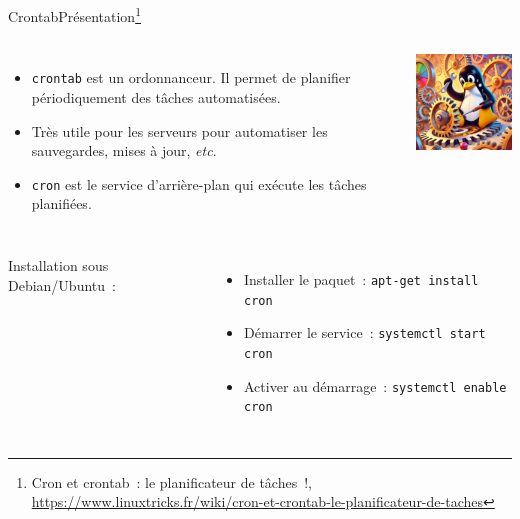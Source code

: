 \documentclass{beamer}
\begin{document}
    \begin{frame}{Crontab}{Présentation\footnote{\label{linuxtricks-cron}Cron et crontab~: le planificateur de tâches~!, \url{https://www.linuxtricks.fr/wiki/cron-et-crontab-le-planificateur-de-taches}}}
        \begin{columns}
            \begin{itemize}
                \item \lstinline{crontab} est un ordonnanceur.
                Il permet de planifier périodiquement des tâches automatisées.
                \item Très utile pour les serveurs pour automatiser les sauvegardes, mises à jour, \textit{etc}.
                \item \lstinline{cron} est le service d'arrière-plan qui exécute les tâches planifiées.
            \end{itemize}
            \includegraphics[width=4cm]{image/pinguin-clockwork}
        \end{columns}
        \bigbreak
        \begin{columns}
            \column{\dimexpr\paperwidth-100pt}
            Installation sous Debian/Ubuntu~:
            \begin{itemize}
                \item Installer le paquet~: \lstinline{apt-get install cron}
                \item Démarrer le service~: \lstinline{systemctl start cron}
                \item Activer au démarrage~: \lstinline{systemctl enable cron}
            \end{itemize}
        \end{columns}
    \end{frame}
\end{document}
